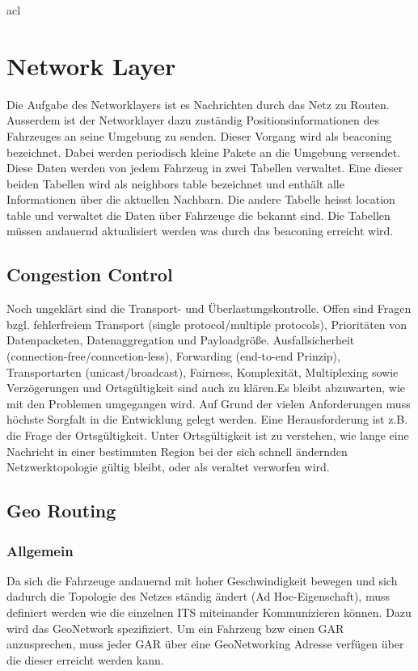 acl\chapter{Network Layer\label{chap:networklayer}}
Die Aufgabe des Networklayers ist es Nachrichten durch das Netz zu Routen. Ausserdem ist der Networklayer dazu zuständig Positionsinformationen des Fahrzeuges an seine Umgebung zu senden. Dieser Vorgang wird als beaconing bezeichnet. Dabei werden periodisch kleine Pakete an die Umgebung versendet. Diese Daten werden von jedem Fahrzeug in zwei Tabellen verwaltet. Eine dieser beiden Tabellen wird als neighbors table bezeichnet und enthält alle Informationen über die aktuellen Nachbarn. Die andere Tabelle heisst location table und verwaltet die Daten über Fahrzeuge die bekannt sind. Die Tabellen müssen andauernd aktualisiert werden was durch das beaconing erreicht wird.

\section{Congestion Control\label{sec:congestioncontrol}}
Noch ungeklärt sind die Transport- und Überlastungskontrolle. Offen sind Fragen bzgl. fehlerfreiem Transport (single protocol/multiple protocols), Prioritäten von Datenpacketen, Datenaggregation und Payloadgröße. Ausfallsicherheit (connection-free/conncetion-less), Forwarding (end-to-end Prinzip), Transportarten (unicast/broadcast), Fairness, Komplexität, Multiplexing sowie Verzögerungen und Ortsgültigkeit sind auch zu klären.Es bleibt abzuwarten, wie mit den Problemen umgegangen wird. Auf Grund der vielen Anforderungen muss höchste Sorgfalt in die Entwicklung gelegt werden. Eine Herausforderung ist z.B. die Frage der Ortsgültigkeit. Unter Ortsgültigkeit ist zu verstehen, wie lange eine Nachricht in einer bestimmten Region bei der sich schnell ändernden Netzwerktopologie gültig bleibt, oder als veraltet verworfen wird.

\section{Geo Routing\label{sec:georouting}}
\subsection{Allgemein}
Da sich die Fahrzeuge andauernd mit hoher Geschwindigkeit bewegen und sich dadurch die Topologie des Netzes ständig ändert (Ad Hoc-Eigenschaft), muss definiert werden wie die einzelnen ITS miteinander Kommunizieren können. Dazu wird das GeoNetwork spezifiziert. Um ein Fahrzeug bzw einen \acl{GAR} anzusprechen, muss jeder \acl{GAR} über eine GeoNetworking Adresse verfügen über die dieser erreicht werden kann. 

